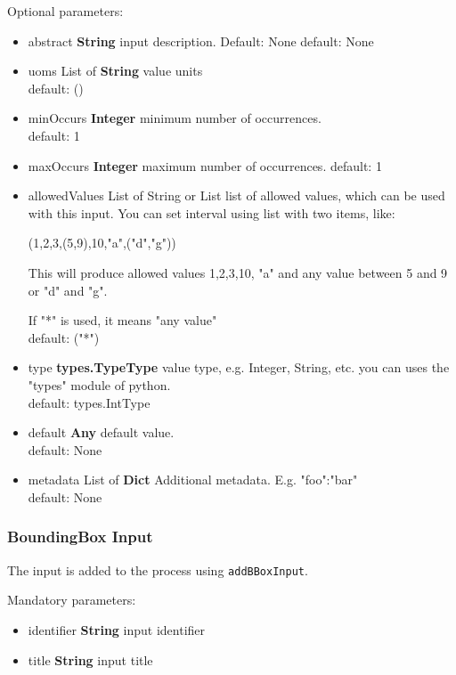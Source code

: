\documentclass[a4paper,11pt]{report}
\begin{document}
Optional parameters:
\begin{itemize}
\item abstract \textbf{String} input description. Default: None
            default: None\\
\item uoms List of \textbf{String} value units\\
            default: ()
\item minOccurs \textbf{Integer} minimum number of occurrences.\\
            default: 1
\item maxOccurs \textbf{Integer} maximum number of occurrences.
            default: 1\\
\item allowedValues  List of {String} or {List} list of allowed values,
            which can be used with this input. You can set interval
            using list with two items, like:

            (1,2,3,(5,9),10,"a",("d","g"))

            This will produce allowed values 1,2,3,10, "a" and
            any value between 5 and 9 or "d" and "g".

            If "*" is used, it means "any value"\\
            default: ("*")
\item type \textbf{types.TypeType} value type, e.g. Integer, String, etc. you
            can uses the "types" module of python.\\
            default: types.IntType
\item default \textbf{Any} default value.\\
            default: None
\item metadata List of \textbf{Dict} Additional metadata. E.g.  {"foo":"bar"}\\
            default: None
\end{itemize}

\subsubsection{BoundingBox Input}
The input is added to the process using \texttt{addBBoxInput}.

Mandatory parameters:
\begin{itemize}
\item identifier \textbf{String} input identifier
\item title \textbf{String} input title
\end{itemize}
\end{document}
